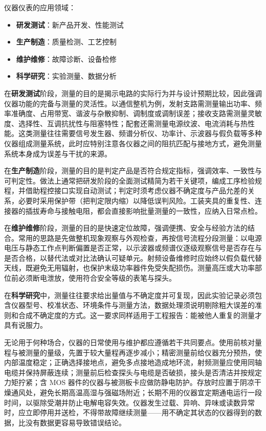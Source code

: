 仪器仪表的应用领域：

\begin{itemize}
    \item \textbf{研发测试}：新产品开发、性能测试
    \item \textbf{生产制造}：质量检测、工艺控制
    \item \textbf{维护维修}：故障诊断、设备检修
    \item \textbf{科学研究}：实验测量、数据分析
\end{itemize}

在\textbf{研发测试}阶段，测量的目的是揭示电路的实际行为并与设计预期比较，因此强调仪器功能的完备与测量的灵活性。以通信整机为例，发射支路需测量输出功率、频率准确度、占用带宽、谐波与杂散抑制、调制度或调制误差；接收支路需测量灵敏度、选择性、互调抗扰性与阻塞特性；配套还需测量电源纹波、电流消耗与热性能。这类测量往往需要信号发生器、频谱分析仪、功率计、示波器与假负载等多种仪器组成测量系统，此时应特别注意各仪器之间的阻抗匹配与接地方式，避免测量系统本身成为误差与干扰的来源。

在\textbf{生产制造}阶段，测量的目的是判定产品是否符合规定指标，强调效率、一致性与可判定性。做法上通常把研发阶段的全面测试精简为若干关键项，编成工序检验规程，并借助程控接口实现自动测试；判定时须考虑仪器不确定度与产品允差的关系，必要时采用保护带（把判定限内缩）以降低误判风险。工装夹具的重复性、连接器的插拔寿命与接触电阻，都会直接影响批量测量的一致性，应纳入日常点检。

在\textbf{维护维修}阶段，测量的目的是快速定位故障，强调便携、安全与经验方法的结合。常用的思路是先做整机现象观察与外观检查，再按信号流程分段测量：以电源电压与静态工作点判断偏置是否正常，以示波器或频谱仪逐级观察信号是否存在与是否合格，以替代法或对比法确认可疑单元。射频设备维修时应始终以假负载代替天线，既避免无用辐射，也保护末级功率器件免受失配损伤。测量高压或大功率部位前必须断电泄放，使用符合安全等级的表笔与探头。

在\textbf{科学研究}中，测量往往要求给出量值与不确定度并可复现，因此实验记录必须包含仪器型号、校准状态、环境条件与测量方法，数据处理须说明剔除粗大误差的准则和合成不确定度的方式。这一要求同样适用于工程报告：能被他人重复的测量才具有说服力。

无论用于何种场合，仪器的日常使用与维护都应遵循若干共同要点。使用前核对量程与被测量的量级，先置于较大量程再逐步减小；精密测量前给仪器充分预热，使内部温度稳定；正确选择接地点，避免多点接地造成地环流，射频测量应使用同轴电缆并保持屏蔽连续；测量前后检查探头与电缆是否破损，接头是否清洁并按规定力矩拧紧；含 MOS 器件的仪器与被测板卡应做防静电防护。存放时应置于阴凉干燥通风处，避免长期高温高湿与强磁场附近；长期不用的仪器宜定期通电运行一段时间，以驱除受潮并防止电解电容失效。仪器发生过载、异响、异味或读数异常时，应立即停用并送检，不得带故障继续测量——用不确定其状态的仪器得到的数据，比没有数据更容易导致错误结论。
